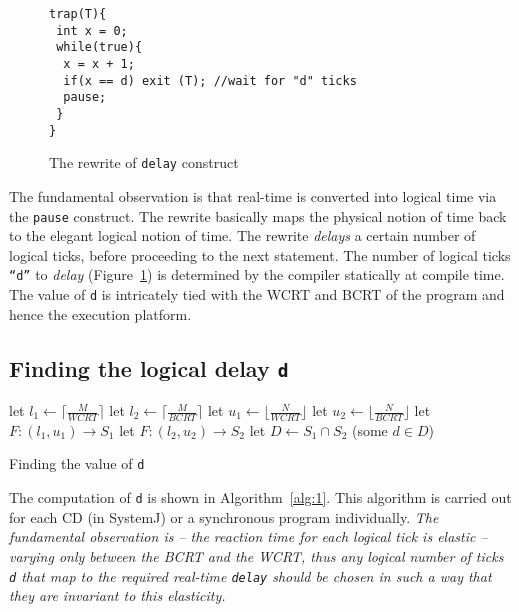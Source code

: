 \begin{figure}[tb]
    \begin{minipage}{\textwidth}
      \begin{scriptsize}
\begin{verbatim}
trap(T){
 int x = 0;
 while(true){
  x = x + 1;
  if(x == d) exit (T); //wait for "d" ticks
  pause;
 }
}
\end{verbatim}
      \end{scriptsize}
    \end{minipage}
    \caption{The rewrite of \texttt{delay} construct}
    \label{fig:3}
\end{figure}

The fundamental observation is that real-time is converted into logical
time via the \texttt{pause} construct. The rewrite basically maps the
physical notion of time back to the elegant logical notion of time. The
rewrite \textit{delays} a certain number of logical ticks, before
proceeding to the next statement. The number of logical ticks
\texttt{``d''} to \textit{delay} (Figure~\ref{fig:3}) is determined by
the compiler statically at compile time. The value of \texttt{d} is
intricately tied with the WCRT and BCRT of the program and hence the
execution platform.

\subsection{Finding the logical delay \texttt{d}}
\label{sec:find-logic-delay}

\begin{algorithm}[t!]
  \begin{minipage}{1.0\linewidth}
    \SetAlgoLined
    let $l_1 \leftarrow \lceil \frac{M}{WCRT} \rceil$\;
    let $l_2 \leftarrow \lceil \frac{M}{BCRT} \rceil$\;
    let $u_1 \leftarrow \lfloor \frac{N}{WCRT} \rfloor$\;
    let $u_2 \leftarrow \lfloor \frac{N}{BCRT} \rfloor$\;
    let $F:(l_1,u_1) \rightarrow S_1$\;
    let $F:(l_2,u_2) \rightarrow S_2$\;
    let $D \leftarrow S_1 \cap S_2$\;
    \Return (some $d \in D$)\;
    \caption{Finding the value of \texttt{d}}
    \label{alg:1}
  \end{minipage}
\end{algorithm}

The computation of \texttt{d} is shown in Algorithm~\ref{alg:1}. This
algorithm is carried out for each CD (in SystemJ) or a synchronous
program individually. \textit{The fundamental observation is -- the
  reaction time for each logical tick is elastic -- varying only between
  the BCRT and the WCRT, thus any logical number of ticks \texttt{d}
  that map to the required real-time \texttt{delay} should be chosen in
  such a way that they are invariant to this elasticity.}

